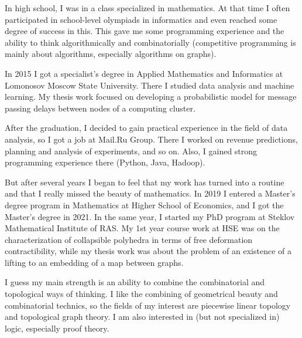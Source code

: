 \documentclass{resume}
\begin{document}
\vspace{1em}
In high school, I was in a class specialized in mathematics. At that time I often participated in
school-level olympiads in informatics and even reached some degree of success in this. This
gave me some programming experience and the ability to think algorithmically and combinatorially
(competitive programming is mainly about algorithms, especially algorithms on graphs).

In 2015 I got a specialist's degree in Applied Mathematics and Informatics at Lomonosov Moscow State
University. There I studied data analysis and machine learning. My thesis work focused on developing
a probabilistic model for message passing delays between nodes of a computing cluster.

After the graduation, I decided to gain practical experience in the field of data analysis, so I got a
job at Mail.Ru Group. There I worked on revenue predictions, planning and analysis of experiments,
and so on. Also, I gained strong programming experience there (Python, Java, Hadoop).

But after several years I began to feel that my work has turned into a routine and that I really
missed the beauty of mathematics. In 2019 I entered a Master's degree program in Mathematics at
Higher School of Economics, and I got the Master's degree in 2021. In the same year, I started my PhD
program at Steklov Mathematical Institute of RAS. My 1st year course work at HSE was on the
characterization of collapsible polyhedra in terms of free deformation contractibility, while my
thesis work was about the problem of an existence of a lifting to an embedding of a map between graphs.

I guess my main strength is an ability to combine the combinatorial and topological ways of
thinking. I like the combining of geometrical beauty and combinatorial technics, so the fields of my
interest are piecewise linear topology and topological graph theory. I am also interested in (but not
specialized in) logic, especially proof theory.


\vspace{1em}
\end{document}
